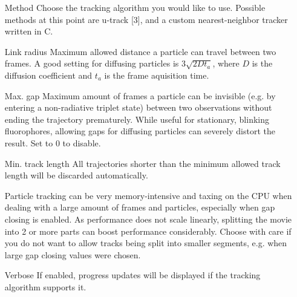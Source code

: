 \documentclass[11pt,onside]{report}
\makeatletter
\numberwithin{equation}{chapter}
\gdef\tshortstack{\@ifnextchar[\@tshortstack{\@tshortstack[c]}}
\gdef\@tshortstack[#1]{%
  \leavevmode
  \vtop\bgroup
    \baselineskip-\p@\lineskip 3\p@
    \let\mb@l\hss\let\mb@r\hss
    \expandafter\let\csname mb@#1\endcsname\relax
    \let\\\@stackcr
    \@ishortstack}
\def\CC{{C\nolinebreak[4]\hspace{-.05em}\raisebox{.4ex}{\tiny\bf ++}}}
\makeatother
\begin{document}
\begin{itemize}[leftmargin=2cm]
\item[Method] Choose the tracking algorithm you would like to use. Possible methods at this point are \textsf{u-track} [3], and a custom nearest-neighbor tracker written in \CC.
\item [Link radius] Maximum allowed distance a particle can travel between two frames. A good setting for diffusing particles is $3\sqrt{2 D t_a}$, where $D$ is the diffusion coefficient and $t_a$ is the frame aquisition time.
\item [Max. gap] Maximum amount of frames a particle can be invisible (e.g. by entering a non-radiative triplet state) between two observations without ending the trajectory prematurely. While useful for stationary, blinking fluorophores, allowing gaps for diffusing particles can severely distort the result. Set to 0 to disable.
\item [Min. track length] All trajectories shorter than the minimum allowed track length will be discarded automatically. 
\item [\smash{\tshortstack[1]{Split movie\\into parts}}] Particle tracking can be very memory-intensive and taxing on the CPU when dealing with a large amount of frames and particles, especially when gap closing is enabled. As performance does not scale linearly, splitting the movie into 2 or more parts can boost performance considerably. Choose with care if you do not want to allow tracks being split into smaller segments, e.g. when large gap closing values were chosen.
\item [Verbose] If enabled, progress updates will be displayed if the tracking algorithm supports it.
\end{itemize}
\clearpage
\end{document}
